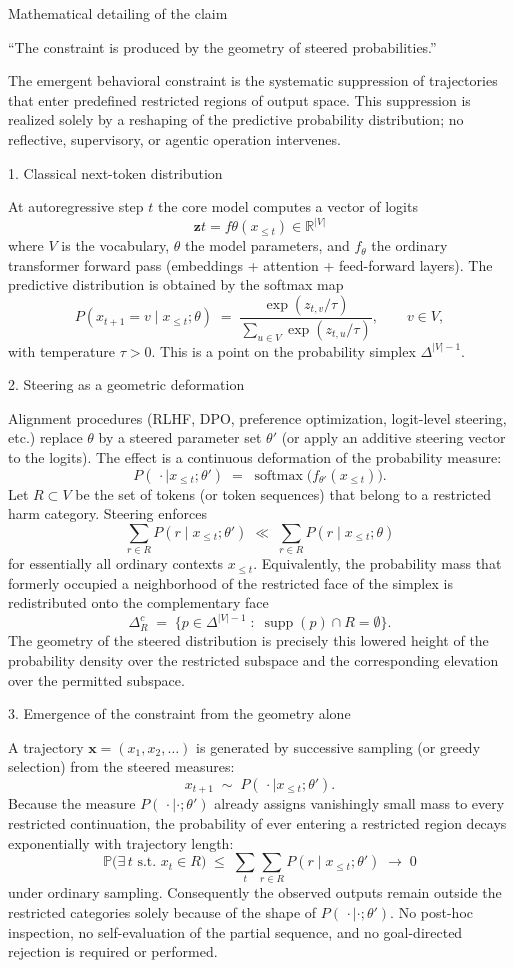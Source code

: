 Mathematical detailing of the claim

“The constraint is produced by the geometry of steered probabilities.”

The emergent behavioral constraint is the systematic suppression of trajectories that enter predefined restricted regions of output space. This suppression is realized solely by a reshaping of the predictive probability distribution; no reflective, supervisory, or agentic operation intervenes.

1. Classical next-token distribution

At autoregressive step \(t\) the core model computes a vector of logits
\[
\mathbf{z}t = f\theta(x_{\le t}) \in \mathbb{R}^{|V|}
\]
where \(V\) is the vocabulary, \(\theta\) the model parameters, and \(f_\theta\) the ordinary transformer forward pass (embeddings + attention + feed-forward layers). The predictive distribution is obtained by the softmax map
\[
P(x_{t+1}=v\mid x_{\le t};\theta)
\;=\;
\frac{\exp(z_{t,v}/\tau)}{\sum_{u\in V}\exp(z_{t,u}/\tau)},
\qquad v\in V,
\]
with temperature \(\tau>0\). This is a point on the probability simplex \(\Delta^{|V|-1}\).

2. Steering as a geometric deformation

Alignment procedures (RLHF, DPO, preference optimization, logit-level steering, etc.) replace \(\theta\) by a steered parameter set \(\theta'\) (or apply an additive steering vector to the logits). The effect is a continuous deformation of the probability measure:
\[
P(\,\cdot\mid x_{\le t};\theta')
\;=\;
\operatorname{softmax}\bigl(f_{\theta'}(x_{\le t})\bigr).
\]
Let \(R\subset V\) be the set of tokens (or token sequences) that belong to a restricted harm category. Steering enforces
\[
\sum_{r\in R}P(r\mid x_{\le t};\theta')
\;\ll\;
\sum_{r\in R}P(r\mid x_{\le t};\theta)
\]
for essentially all ordinary contexts \(x_{\le t}\). Equivalently, the probability mass that formerly occupied a neighborhood of the restricted face of the simplex is redistributed onto the complementary face
\[
\Delta_R^c
\;=\;
\bigl\{p\in\Delta^{|V|-1}\;:\;
\operatorname{supp}(p)\cap R=\emptyset\bigr\}.
\]
The geometry of the steered distribution is precisely this lowered height of the probability density over the restricted subspace and the corresponding elevation over the permitted subspace.

3. Emergence of the constraint from the geometry alone

A trajectory \(\mathbf{x}=(x_1,x_2,\dots)\) is generated by successive sampling (or greedy selection) from the steered measures:
\[
x_{t+1}\;\sim\;P(\,\cdot\mid x_{\le t};\theta').
\]
Because the measure \(P(\,\cdot\mid\cdot;\theta')\) already assigns vanishingly small mass to every restricted continuation, the probability of ever entering a restricted region decays exponentially with trajectory length:
\[
\mathbb{P}\bigl(\exists\,t\text{ s.t. }x_t\in R\bigr)
\;\le\;
\sum_t\sum_{r\in R}P(r\mid x_{\le t};\theta')
\;\to\;0
\]
under ordinary sampling. Consequently the observed outputs remain outside the restricted categories solely because of the shape of \(P(\,\cdot\mid\cdot;\theta')\). No post-hoc inspection, no self-evaluation of the partial sequence, and no goal-directed rejection is required or performed.

